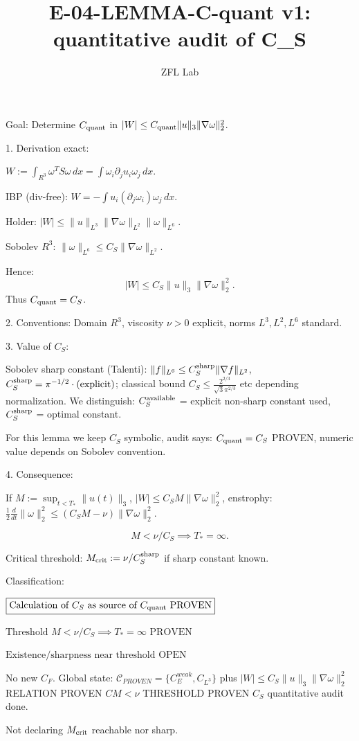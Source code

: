 \documentclass[11pt]{article}
\title{E-04-LEMMA-C-quant v1: quantitative audit of C\_S}
\author{ZFL Lab}
\begin{document}
\maketitle

Goal: Determine $C_{\rm quant}$ in $|W|\le C_{\rm quant}\|u\|_3\|\nabla\omega\|_2^2$.

1. Derivation exact:

$W:=\int_{R^3}\omega^T S \omega\,dx = \int \omega_i \partial_j u_i \omega_j\,dx$.

IBP (div-free):
$W = -\int u_i (\partial_j\omega_i)\omega_j\,dx$.

Holder:
$|W| \le \|u\|_{L^3}\|\nabla\omega\|_{L^2}\|\omega\|_{L^6}$.

Sobolev $R^3$:
$\|\omega\|_{L^6}\le C_S\|\nabla\omega\|_{L^2}$.

Hence:
\begin{equation*}
\boxed{|W|\le C_S \|u\|_3\|\nabla\omega\|_2^2.}
\end{equation*}
Thus $C_{\rm quant}=C_S$.

2. Conventions:
Domain $R^3$, viscosity $\nu>0$ explicit, norms $L^3,L^2,L^6$ standard.

3. Value of $C_S$:

Sobolev sharp constant (Talenti):
$\|f\|_{L^6}\le C_S^{\rm sharp}\|\nabla f\|_{L^2}$,
$C_S^{\rm sharp} = \pi^{-1/2} \cdot ( \text{explicit}) $; classical bound $C_S\le \frac{2^{2/3}}{ \sqrt{3}\pi^{2/3}}$ etc depending normalization.
We distinguish:
$C_S^{\rm available}$ = explicit non-sharp constant used,
$C_S^{\rm sharp}$ = optimal constant.

For this lemma we keep $C_S$ symbolic, audit says:
$C_{\rm quant}=C_S$ PROVEN, numeric value depends on Sobolev convention.

4. Consequence:

If $M:=\sup_{t<T_*}\|u(t)\|_3$,
$|W|\le C_S M \|\nabla\omega\|_2^2$,
enstrophy: $\frac12 \frac{d}{dt}\|\omega\|_2^2 \le (C_S M -\nu)\|\nabla\omega\|_2^2$.

\begin{equation*}
\boxed{M<\nu/C_S \implies T_*=\infty.}
\end{equation*}

Critical threshold:
$M_{\rm crit}:=\nu/C_S^{\rm sharp}$ if sharp constant known.

Classification:

$\boxed{\text{Calculation of }C_S \text{ as source of }C_{\rm quant} \text{ PROVEN}}$

$\boxed{\text{Threshold }M<\nu/C_S \implies T_*=\infty \text{ PROVEN}}$

$\boxed{\text{Existence/sharpness near threshold OPEN}}$

No new $C_F$. Global state:
$\mathcal{C}_{PROVEN}=\{C_E^{weak},C_{L^3}\}$ plus
$|W|\le C_S\|u\|_3\|\nabla\omega\|_2^2$ RELATION PROVEN
$CM<\nu$ THRESHOLD PROVEN
$C_S$ quantitative audit done.

Not declaring $M_{\rm crit}$ reachable nor sharp.
\end{document}
